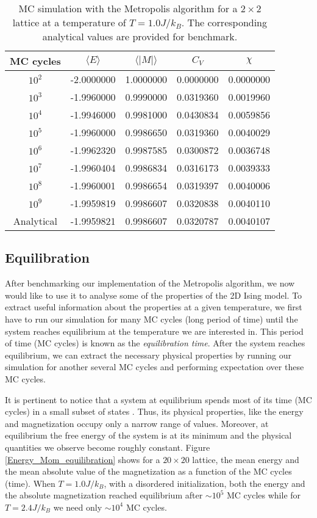 \documentclass[a4paper]{article}
\begin{document}
\begin{table}[H]
	\centering
	\begin{tabular}{ccccc}
		\hline
		\hline
		MC cycles & $\langle E \rangle$ & $\langle |M| \rangle$ & $C_V$ & $\chi$\\ 
		\hline
		$10^2$ & -2.0000000 & 1.0000000 & 0.0000000 & 0.0000000 \\ 
		$10^3$ & -1.9960000 & 0.9990000 & 0.0319360 & 0.0019960 \\ 
		$10^4$ & -1.9946000 & 0.9981000 & 0.0430834 & 0.0059856 \\ 
		$10^5$ & -1.9960000 & 0.9986650 & 0.0319360 & 0.0040029 \\ 
		$10^6$ & -1.9962320 & 0.9987585 & 0.0300872 & 0.0036748 \\
		$10^7$ & -1.9960404 & 0.9986834 & 0.0316173 & 0.0039333 \\
		$10^8$ & -1.9960001 & 0.9986654 & 0.0319397 & 0.0040006 \\
		$10^9$ & -1.9959819 & 0.9986607 & 0.0320838 & 0.0040110 \\
		Analytical & -1.9959821 & 0.9986607 & 0.0320787 & 0.0040107 \\
		\hline
		\hline 
	\end{tabular} 
	\caption{MC simulation with the Metropolis algorithm for a $2\times2$ lattice at a temperature of $T=1.0 J/k_B$. The corresponding analytical values are provided for benchmark. }
	\label{tab:2by2}
\end{table}

\subsection{Equilibration}
After benchmarking our implementation of the Metropolis algorithm, we now would like to use it to analyse some of the properties of the 2D Ising model. To extract useful information about the properties at a given temperature, we first have to run our simulation for many MC cycles (long period of time) until the system reaches equilibrium at the temperature we are interested in. This period of time (MC cycles) is known as the \textit{equilibration time}. After the system reaches equilibrium, we can extract the necessary physical properties by running our simulation for another several MC cycles and performing expectation over these MC cycles.

It is pertinent to notice that a system at equilibrium spends most of its time (MC cycles) in a small subset of states \cite{newmanb99}. Thus, its physical properties, like the energy and magnetization occupy only a narrow range of values. Moreover, at equilibrium the free energy of the system is at its minimum and the physical quantities we observe become roughly constant. Figure \ref{Energy_Mom_equilibration} shows for a $20\times20$ lattice, the mean energy and the mean absolute value of the magnetization as a function of the MC cycles (time). When $T=1.0 J/k_B$, with a disordered initialization, both the energy and the absolute magnetization reached equilibrium after $\sim 10^5$ MC cycles while for $T=2.4 J/k_B$ we need only $\sim10^4$ MC cycles.
\end{document}
